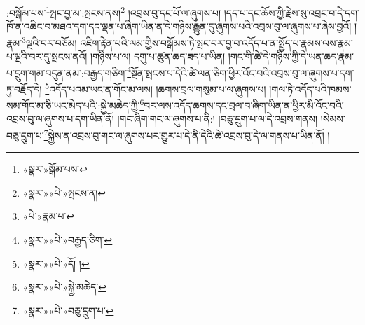 :བསྒོམ་པས་\footnote{«སྣར་»སྒོམ་པས་}སྤང་བྱ་མ་:སྤངས་ནས།\footnote{«སྣར་»«པེ་»སྤངས་ན།} །འབྲས་བུ་དང་པོ་ལ་ཞུགས་པ། །དད་པ་དང་ཆོས་ཀྱི་རྗེས་སུ་འབྲང་བ་དེ་དག་ཁོ་ན་འཆིང་བ་མཐའ་དག་དང་ལྡན་པ་ཞིག་ཡིན་ན་དེ་གཉིས་རྒྱུན་དུ་ཞུགས་པའི་འབྲས་བུ་ལ་ཞུགས་པ་ཞེས་བྱའོ། །རྣམ་\footnote{«པེ་»རྣམ་པ་}ལྔའི་བར་བཅོམ། འཇིག་རྟེན་པའི་ལམ་གྱིས་བསྒོམས་ཏེ་སྤང་བར་བྱ་བ་འདོད་པ་ན་སྤྱོད་པ་རྣམས་ལས་རྣམ་པ་ལྔའི་བར་དུ་སྤངས་ནའོ། །གཉིས་པ་ལ། དགུ་པ་ཚུན་ཆད་ཟད་པ་ཡིན། །གང་གི་ཚེ་དེ་གཉིས་ཀྱི་དེ་ཡན་ཆད་རྣམ་པ་དྲུག་གམ་བདུན་ནམ་:བརྒྱད་གཅིག་\footnote{«སྣར་»«པེ་»བརྒྱད་ཅིག་}སྔོན་སྤངས་པ་དེའི་ཚེ་ལན་ཅིག་ཕྱིར་འོང་བའི་འབྲས་བུ་ལ་ཞུགས་པ་དག་ཏུ་བརྗོད་དེ། \footnote{«སྣར་»«པེ་»དོ། ། }འདོད་པའམ་ཡང་ན་གོང་མ་ལས། །ཆགས་བྲལ་གསུམ་པ་ལ་ཞུགས་པ། །གལ་ཏེ་འདོད་པའི་ཁམས་སམ་གོང་མ་ཅི་ཡང་མེད་པའི་:སྐྱེ་མཆེད་ཀྱི་\footnote{«སྣར་»«པེ་»སྐྱེ་མཆེད་}བར་ལས་འདོད་ཆགས་དང་བྲལ་བ་ཞིག་ཡིན་ན་ཕྱིར་མི་འོང་བའི་འབྲས་བུ་ལ་ཞུགས་པ་དག་ཡིན་ནོ། །གང་ཞིག་གང་ལ་ཞུགས་པ་ནི:། །བཅུ་དྲུག་པ་ལ་དེ་འབྲས་གནས། །སེམས་བཅུ་དྲུག་པ་\footnote{«སྣར་»«པེ་»བཅུ་དྲུག་པ་}སྐྱེས་ན་འབྲས་བུ་གང་ལ་ཞུགས་པར་གྱུར་པ་དེ་ནི་དེའི་ཚེ་འབྲས་བུ་དེ་ལ་གནས་པ་ཡིན་ནོ། །
